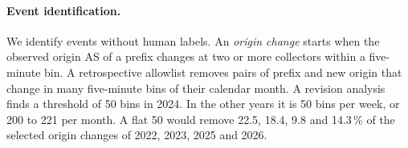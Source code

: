 \paragraph{Event identification.}
We identify events without human labels.
An \emph{origin change} starts when the observed origin AS of a prefix changes at two or more collectors within a five-minute bin.
A retrospective allowlist removes pairs of prefix and new origin that change in many five-minute bins of their calendar month.
A revision analysis finds a threshold of 50 bins in 2024.
In the other years it is 50 bins per week, or 200 to 221 per month.
A flat 50 would remove 22.5, 18.4, 9.8 and 14.3\,\% of the selected origin changes of 2022, 2023, 2025 and 2026.
